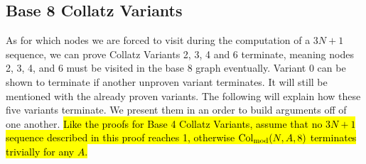 \subsection{Base 8 Collatz Variants} \label{subsubsec:base8subprob}
As for which nodes we are forced to visit during the computation of a $3N+1$ sequence, we can prove Collatz Variants 2, 3, 4 and 6 terminate, meaning nodes 2, 3, 4, and 6 must be visited in the base 8 graph eventually. Variant 0 can be shown to terminate if another unproven variant terminates. It will still be mentioned with the already proven variants. The following will explain how these five variants terminate. We present them in an order to build arguments off of one another. \hl{Like the proofs for Base 4 Collatz Variants, assume that no $3N+1$ sequence described in this proof reaches 1, otherwise $\mathrm{Col}_{\text{mod}}(N,A,8)$ terminates trivially for any $A$.}
